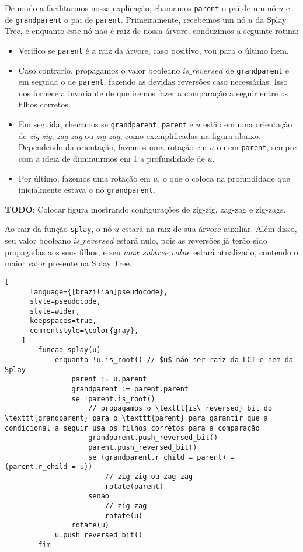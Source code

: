 De modo a facilitarmos nossa explicação, chamamos \texttt{parent} o pai de um nó $u$ e de \texttt{grandparent} o pai de \texttt{parent}. Primeiramente, recebemos um nó $u$ da Splay Tree, e enquanto este nó não é raiz de nossa árvore, conduzimos a seguinte rotina:

\begin{itemize}
    \item Verifico se \texttt{parent} é a raiz da árvore, caso positivo, vou para o último item.
    \item Caso contrario, propagamos o valor booleano $is\_reversed$ de \texttt{grandparent} e em seguida o de \texttt{parent}, fazendo as devidas reversões caso necessárias. Isso nos fornece a invariante de que iremos fazer a comparação a seguir entre os filhos corretos.
    \item Em seguida, checamos se \texttt{grandparent}, \texttt{parent} e $u$ estão em uma orientação de \textit{zig-zig}, \textit{zag-zag} ou \textit{zig-zag}, como exemplificadas na figura abaixo. Dependendo da orientação, fazemos uma rotação em $u$ ou em \texttt{parent}, sempre com a ideia de diminuirmos em 1 a profundidade de $u$.
    \item Por último, fazemos uma rotação em $u$, o que o coloca na profundidade que inicialmente estava o nó \texttt{grandparent}.
\end{itemize}

\begin{center}
    \textbf{TODO}: Colocar figura mostrando configurações de zig-zig, zag-zag e zig-zags.
\end{center}

Ao sair da função \texttt{splay}, o nó $u$ estará na raiz de sua árvore auxiliar. Além disso, seu valor booleano $is\_reversed$ estará nulo, pois as reversões já terão sido propagadas aos seus filhos, e seu $max\_subtree\_value$ estará atualizado, contendo o maior valor presente na Splay Tree.

\begin{programruledcaption}{\label{splay:splay}}
    \begin{lstlisting}[
      language={[brazilian]pseudocode},
      style=pseudocode,
      style=wider,
      keepspaces=true,
      commentstyle=\color{gray},
    ]
        funcao splay(u)
            enquanto !u.is_root() // $u$ não ser raiz da LCT e nem da Splay
                parent := u.parent
                grandparent := parent.parent
                se !parent.is_root()
                    // propagamos o \texttt{is\_reversed} bit do \texttt{grandparent} para o \texttt{parent} para garantir que a condicional a seguir usa os filhos corretos para a comparação
                    grandparent.push_reversed_bit()
                    parent.push_reversed_bit()
                    se (grandparent.r_child = parent) = (parent.r_child = u))
                        // zig-zig ou zag-zag
                        rotate(parent)
                    senao
                        // zig-zag
                        rotate(u)
                rotate(u)
            u.push_reversed_bit()
        fim
    \end{lstlisting}
\end{programruledcaption}

